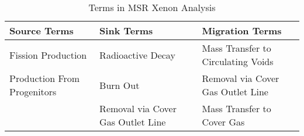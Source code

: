 \begin{table}[ht]
\begin{tabularx}{\linewidth}{ |X|X|X| }
  \hline
 \textbf{Source Terms} & \textbf{Sink Terms} & \textbf{Migration Terms} \\
  \hline 
  Fission Production  & Radioactive Decay  & Mass Transfer to Circulating Voids   \\
  \hline
  Production From Progenitors & Burn Out & Removal via Cover Gas Outlet Line \\
   \hline
    & Removal via Cover Gas Outlet Line & Mass Transfer to Cover Gas \\
   \hline
\end{tabularx}
\caption{Terms in MSR Xenon Analysis }
\label{termTable}
\end{table}




